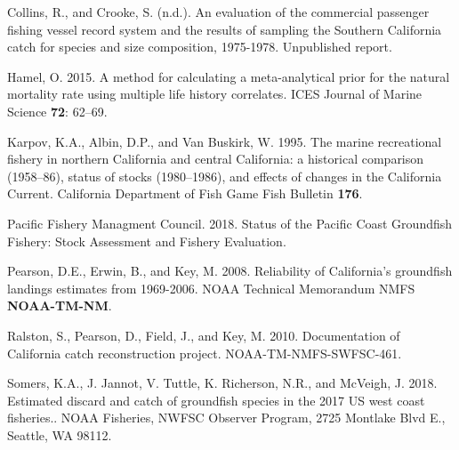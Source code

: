 \documentclass[12pt,]{article}
\begin{document}
\hypertarget{ref-Collins1978}{}
Collins, R., and Crooke, S. (n.d.). An evaluation of the commercial
passenger fishing vessel record system and the results of sampling the
Southern California catch for species and size composition, 1975-1978.
Unpublished report.

\hypertarget{ref-Hamel2015}{}
Hamel, O. 2015. A method for calculating a meta-analytical prior for the
natural mortality rate using multiple life history correlates. ICES
Journal of Marine Science \textbf{72}: 62--69.

\hypertarget{ref-Karpov1995}{}
Karpov, K.A., Albin, D.P., and Van Buskirk, W. 1995. The marine
recreational fishery in northern California and central California: a
historical comparison (1958--86), status of stocks (1980--1986), and
effects of changes in the California Current. California Department of
Fish Game Fish Bulletin \textbf{176}.

\hypertarget{ref-PSMFC2018}{}
Pacific Fishery Managment Council. 2018. Status of the Pacific Coast
Groundfish Fishery: Stock Assessment and Fishery Evaluation.

\hypertarget{ref-Pearson2008}{}
Pearson, D.E., Erwin, B., and Key, M. 2008. Reliability of California's
groundfish landings estimates from 1969-2006. NOAA Technical Memorandum
NMFS \textbf{NOAA-TM-NM}.

\hypertarget{ref-Ralston2010}{}
Ralston, S., Pearson, D., Field, J., and Key, M. 2010. Documentation of
California catch reconstruction project. NOAA-TM-NMFS-SWFSC-461.

\hypertarget{ref-Somers2018}{}
Somers, K.A., J. Jannot, V. Tuttle, K. Richerson, N.R., and McVeigh, J.
2018. Estimated discard and catch of groundfish species in the 2017 US
west coast fisheries.. NOAA Fisheries, NWFSC Observer Program, 2725
Montlake Blvd E., Seattle, WA 98112.
\end{document}
